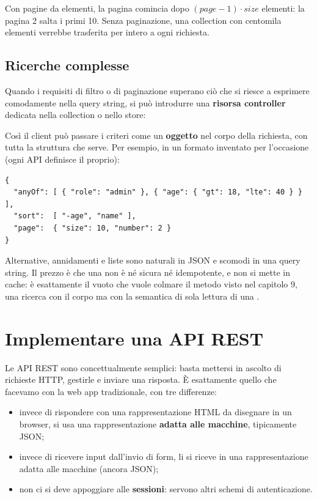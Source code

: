 Con pagine da  elementi, la pagina  comincia dopo
$(\mathit{page}-1)\cdot\mathit{size}$ elementi: la pagina 2 salta i primi 10.
Senza paginazione, una collection con centomila elementi verrebbe trasferita
per intero a ogni richiesta.

\subsection{Ricerche complesse}

Quando i requisiti di filtro o di paginazione superano ciò che si riesce a
esprimere comodamente nella query string, si può introdurre una
\textbf{risorsa controller} dedicata nella collection o nello store:

\begin{center}
\end{center}

Così il client può passare i criteri come un \textbf{oggetto} nel corpo della
richiesta, con tutta la struttura che serve. Per esempio, in un formato
inventato per l'occasione (ogni API definisce il proprio):

\begin{lstlisting}[style=json, name=corpo di POST /users/search]
{
  "anyOf": [ { "role": "admin" }, { "age": { "gt": 18, "lte": 40 } } ],
  "sort":  [ "-age", "name" ],
  "page":  { "size": 10, "number": 2 }
}
\end{lstlisting}

Alternative, annidamenti e liste sono naturali in JSON e scomodi in una query
string. Il prezzo è che una  non è né sicura né idempotente, e non
si mette in cache: è esattamente il vuoto che vuole colmare il metodo
 visto nel capitolo 9, una ricerca con il corpo ma con la
semantica di sola lettura di una .

\section{Implementare una API REST}

Le API REST sono concettualmente semplici: basta mettersi in ascolto di
richieste HTTP, gestirle e inviare una risposta. È esattamente quello che
facevamo con la web app tradizionale, con tre differenze:

\begin{itemize}
  \item invece di rispondere con una rappresentazione HTML da disegnare in un
        browser, si usa una rappresentazione \textbf{adatta alle macchine},
        tipicamente JSON;
  \item invece di ricevere input dall'invio di form, li si riceve in una
        rappresentazione adatta alle macchine (ancora JSON);
  \item non ci si deve appoggiare alle \textbf{sessioni}: servono altri schemi
        di autenticazione.
\end{itemize}

